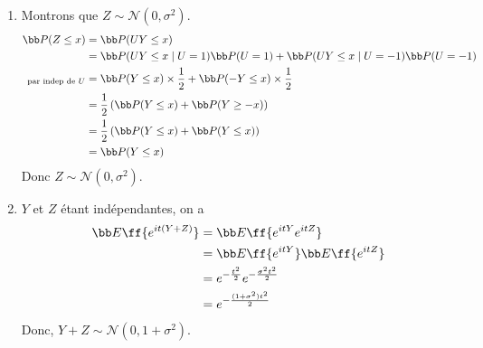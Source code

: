 {\begin{td-sol}[]
\begin{enumerate}
            \item Montrons que \(Z \sim \mathcal N(0,\sigma^2)\).
            \begin{equation*}
                \begin{aligned}
                    \bb P(Z \leq x)
                    &= \bb P(UY \leq x)\\
                    &= \bb P(UY\leq x \mid U=1) \bb P(U=1) 
                    + \bb P(UY\leq x \mid U=-1) \bb P(U=-1)\\
                    {}_{\text{par indep de }U}&= \bb P(Y\leq x) \times \frac{1}{2} + \bb P(-Y\leq x) \times \frac{1}{2}\\
                    &= \frac{1}{2} \left(\bb P(Y\leq x) + \bb P(Y\geq -x)\right)\\
                    &= \frac{1}{2} \left(\bb P(Y\leq x) + \bb P(Y\leq x)\right)\\
                    &= \bb P(Y\leq x)
                \end{aligned}
            \end{equation*}
            Donc \(Z \sim \mathcal N(0,\sigma^2)\).

            \item \(Y\) et \(Z\) étant indépendantes, on a
            \begin{equation*}
                \begin{aligned}
                    \bb E\ff{e^{it(Y+Z)}}
                    &= \bb E\ff{e^{itY}e^{itZ}}\\
                    &= \bb E\ff{e^{itY}}\bb E\ff{e^{itZ}}\\
                    &= e^{-\frac{t^2}{2}}e^{-\frac{\sigma^2t^2}{2}}\\
                    &= e^{-\frac{(1+\sigma^2)t^2}{2}}
                \end{aligned}
            \end{equation*}
            Donc, \(Y + Z \sim \mathcal N(0,1+\sigma^2)\).
        \end{enumerate}
    \end{td-sol}
}{}
